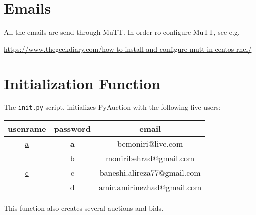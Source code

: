 \documentclass{article}
\begin{document}
\section{Emails}
All the emails are send through MuTT. In order ro configure MuTT, see e.g.

\url{https://www.thegeekdiary.com/how-to-install-and-configure-mutt-in-centos-rhel/}


\section{Initialization Function}

The \texttt{init.py} script, initializes PyAuction with the following five users:


\begin{table}[h!]
	\centering
	\begin{tabular}{ccc}
		\multicolumn{1}{l}{usenrame}                          & \multicolumn{1}{l}{password}                   & email                                                                   \\ \hline
		\multicolumn{1}{|c|}{{\ul a}}                         & \multicolumn{1}{c|}{\textbf{a}}                & \multicolumn{1}{c|}{bemoniri@live.com}                                  \\ \hline
		\rowcolor[HTML]{EFEFEF} 
		\multicolumn{1}{|c|}{\cellcolor[HTML]{EFEFEF}{\ul b}} & \multicolumn{1}{c|}{\cellcolor[HTML]{EFEFEF}b} & \multicolumn{1}{c|}{\cellcolor[HTML]{EFEFEF}moniribehrad@gmail.com}     \\ \hline
		\multicolumn{1}{|c|}{{\ul c}}                         & \multicolumn{1}{c|}{c}                         & \multicolumn{1}{c|}{baneshi.alireza77@gmail.com}                        \\ \hline
		\rowcolor[HTML]{EFEFEF} 
		\multicolumn{1}{|c|}{\cellcolor[HTML]{EFEFEF}{\ul d}} & \multicolumn{1}{c|}{\cellcolor[HTML]{EFEFEF}d} & \multicolumn{1}{c|}{\cellcolor[HTML]{EFEFEF}amir.amirinezhad@gmail.com} \\ \hline
	\end{tabular}
\end{table}

This function also creates several auctions and bids.
\end{document}
